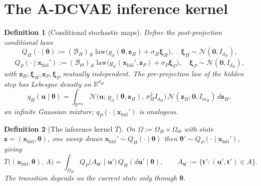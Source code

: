 \documentclass[11pt]{article}
\theoremstyle{definitionbreak}
\newtheorem{definition}{Definition}[section]
\theoremstyle{plainbreak}
\theoremstyle{remarkbreak}
\newcommand{\R}{\mathbb{R}}
\newcommand{\Om}{\Omega}
\newcommand{\Normal}{\mathcal{N}}
\newcommand{\xhid}{\bm{x}_{\mathrm{hid}}}
\newcommand{\bth}{\bm{\theta}}
\newcommand{\push}{{}_{\#}}
\begin{document}
\section{The A-DCVAE inference kernel}
\label{sec:kernel}

\begin{definition}[Conditional stochastic maps]
\label{def:condmaps}
Define the post-projection conditional laws
\[
  Q_H(\cdot\mid\bth):=(\mathcal B_H)\push\ \mathrm{law}\big(g_\phi(\bth,\bm z_H)+\sigma_H\bm\xi_H\big),
  \quad \bm\xi_H\sim\Normal(\bm0,I_{d_H}),
\]
\[
  Q_P(\cdot\mid\xhid'):=(\mathcal B_\Theta)\push\ \mathrm{law}\big(g_\psi(\xhid',\bm z_P)+\sigma_P\bm\xi_P\big),
  \quad \bm\xi_P\sim\Normal(\bm0,I_{d_\Theta}),
\]
with $\bm z_H,\bm\xi_H,\bm z_P,\bm\xi_P$ mutually independent. The pre-projection law of the hidden
step has Lebesgue density on $\R^{d_H}$
\begin{equation}\label{eq:qH-density}
  q_H(\bm u\mid\bth)=\int_{\R^{m_H}}\Normal\big(\bm u;\,g_\phi(\bth,\bm z_H),\,\sigma_H^2 I_{d_H}\big)\,
  \Normal(\bm z_H;\bm0,I_{m_H})\,d\bm z_H,
\end{equation}
an infinite Gaussian mixture; $q_P(\cdot\mid\xhid')$ is analogous.
\end{definition}

\begin{definition}[The inference kernel $T$]
\label{def:T}
On $\Om:=\Om_H\times\Om_\Theta$ with state $\bm z=(\xhid,\bth)$, one sweep draws
$\xhid'\sim Q_H(\cdot\mid\bth)$ then $\bth'\sim Q_P(\cdot\mid\xhid')$, giving
\[
  T\big((\xhid,\bth),\,A\big)=\int_{\Om_H} Q_P\big(A_{\bm u'}\mid\bm u'\big)\,Q_H(d\bm u'\mid\bth),
  \qquad A_{\bm u'}:=\{\bm t':(\bm u',\bm t')\in A\}.
\]
The transition depends on the current state only through $\bth$.
\end{definition}
\end{document}
